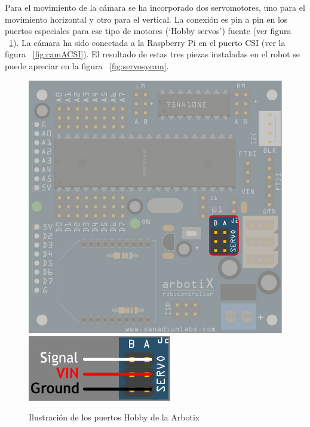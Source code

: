 Para el movimiento de la cámara se ha incorporado dos servomotores, uno para el movimiento horizontal y otro para el vertical. La conexión es pin a pin en los puertos especiales para ese tipo de motores (‘Hobby servos’) fuente (ver figura ~\ref{fig:puertosHobby}). La cámara ha sido conectada a la Raspberry Pi en el puerto CSI (ver la figura ~\ref{fig:camACSI}). El resultado de estas tres piezas instaladas en el robot se puede apreciar en la figura ~\ref{fig:servosycam}.

\begin{figure}[hbtp]
\includegraphics[scale=0.3]{imagenes/arbotix_hobby_servo.jpg}
\includegraphics[scale=0.7]{imagenes/arbotix_hobbyservos_lines.jpg}
\caption{Ilustración de los puertos Hobby de la Arbotix}
\label{fig:puertosHobby}
\end{figure}

